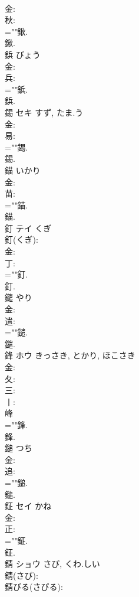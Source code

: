 \documentclass[8pt]{extreport}
\begin{document}
\begin{CJK}{UTF8}{min}
\\	金: 
\\	秋: 
\\	=""鍬.
\\	鍬.
\\	鋲		びょう				
\\	金: 
\\	兵: 
\\	=""鋲.
\\	鋲.
\\	錫	セキ	すず, たま.う		
\\	金: 
\\	易: 
\\	=""錫.
\\	錫.
\\	錨		いかり				
\\	金: 
\\	苗: 
\\	=""錨.
\\	錨.
\\	釘	テイ	くぎ		
\\	釘(くぎ): 
\\	金: 
\\	丁: 
\\	=""釘.
\\	釘.
\\	鑓		やり				
\\	金: 
\\	遣: 
\\	=""鑓.
\\	鑓.
\\	鋒	ホウ	きっさき, とかり, ほこさき		
\\	金: 
\\	夂: 
\\	三: 
\\	丨: 
\\	峰 
\\	=""鋒.
\\	鋒.
\\	鎚		つち				
\\	金: 
\\	追: 
\\	=""鎚.
\\	鎚.
\\	鉦	セイ	かね		
\\	金: 
\\	正: 
\\	=""鉦.
\\	鉦.
\\	錆	ショウ	さび, くわ.しい		
\\	錆(さび): 
\\	錆びる(さびる): 

\end{CJK}
\end{document}
